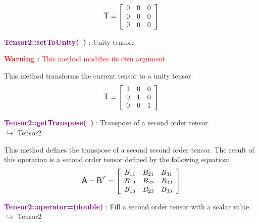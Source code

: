 \begin{equation*}
\mbox{\large\ensuremath{\mathsf{T}}}=\left[\begin{array}{ccc}
0&0&0\\
0&0&0\\
0&0&0
\end{array}\right]
\end{equation*}

\textcolor{purple}{\textbf{Tensor2::setToUnity(~)}}\label{Tensor2::setToUnity()} : Unity tensor.

\hspace*{10mm}\textcolor{red}{\textbf{Warning :} This method modifies its own argument}

This method transforms the current tensor to a unity tensor.
\begin{equation*}
\mbox{\large\ensuremath{\mathsf{T}}}=\left[\begin{array}{ccc}
1&0&0\\
0&1&0\\
0&0&1
\end{array}\right]
\end{equation*}

\textcolor{purple}{\textbf{Tensor2::getTranspose(~)}}\label{Tensor2::getTranspose()} : Transpose of a second order tensor.\\ \hspace*{5mm}$\hookrightarrow$ Tensor2

This method defines the transpose of a second second order tensor.
The result of this operation is a second order tensor defined by the following equation:
\begin{equation*}
\mbox{\large\ensuremath{\mathsf{A}}}=\mbox{\large\ensuremath{\mathsf{B}}}^T =\left[\begin{array}{ccc}
  B_{11} & B_{21} & B_{31}\\
  B_{12} & B_{22} & B_{32}\\
  B_{13} & B_{23} & B_{33}
  \end{array}\right]
\end{equation*}

\textcolor{purple}{\textbf{Tensor2::operator=(double)}}\label{Tensor2::operator=(double)} : Fill a second order tensor with a scalar value.\\ \hspace*{5mm}$\hookrightarrow$ Tensor2

